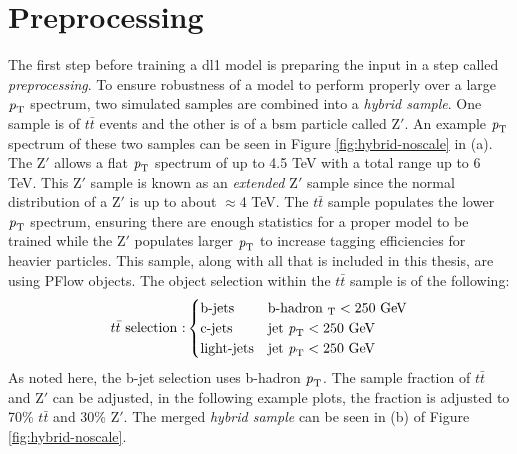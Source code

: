 \section{Preprocessing}

The first step before training a \gls{dl1} model is preparing the input in a step called \textit{preprocessing}. To ensure robustness of a model to perform properly over a large 
$\textrm{\textit{p}}_{\textrm{T}}$ spectrum, two simulated samples are combined into a \textit{hybrid sample}. One sample is of $t\bar{t}$ events and the other is of a \gls{bsm} particle 
called $\textrm{Z}'$. An example $\textrm{\textit{p}}_{\textrm{T}}$ spectrum of these two samples can be seen in Figure \ref{fig:hybrid-noscale} in (a). The $\textrm{Z}'$ allows a flat $\textrm{\textit{p}}_{\textrm{T}}$ spectrum of up to 4.5 TeV with a 
total range up to 6 TeV. This $\textrm{Z}'$ sample is known as an \textit{extended $\textrm{Z}'$} sample since the normal distribution of a $\textrm{Z}'$ is up to about $\approx$4 TeV. The $t\bar{t}$ sample populates the lower $\textrm{\textit{p}}_{\textrm{T}}$ spectrum, ensuring there are enough statistics for a proper model to be trained while the $\textrm{Z}'$ populates 
larger $\textrm{\textit{p}}_{\textrm{T}}$ to increase tagging efficiencies for heavier particles. This sample, along with all that is included in this thesis, are using PFlow objects. 
The object selection within the $t\bar{t}$ sample is of the following:
%
\[
 t\bar{t} \ \textrm{selection :} \begin{cases}
       \textrm{b-jets} & \textrm{b-hadron} \ \textrm{\textit{}}_{\textrm{T}} < \textrm{250 GeV}\\ 
       \textrm{c-jets} & \textrm{jet} \ \textrm{\textit{p}}_{\textrm{T}} < \textrm{250 GeV}\\
       \textrm{light-jets} & \textrm{jet} \ \textrm{\textit{p}}_{\textrm{T}} < \textrm{250 GeV}\\
\end{cases}\]
%
As noted here, the b-jet selection uses b-hadron $\textrm{\textit{p}}_{\textrm{T}}$. The sample fraction of $t\bar{t}$ and $\textrm{Z}'$ can be adjusted, in the following example plots, 
the fraction is adjusted to 70\% $t\bar{t}$ and 30\% $\textrm{Z}'$. The merged \textit{hybrid sample} can be seen in (b) of Figure \ref{fig:hybrid-noscale}.

